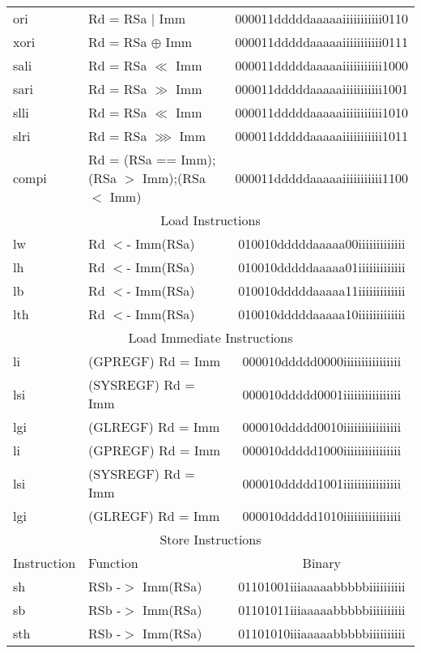 \documentclass[letterpaper, 11pt]{article}
\begin{document}
\begin{center}
\begin{longtable}{|l|l|c|}
			ori			& Rd = RSa $|$ Imm 								& 000011dddddaaaaaiiiiiiiiiii0110 \\
			xori		& Rd = RSa $\oplus$ Imm 						& 000011dddddaaaaaiiiiiiiiiii0111 \\
			sali		& Rd = RSa $\ll$ Imm 							& 000011dddddaaaaaiiiiiiiiiii1000 \\
			sari		& Rd = RSa $\gg$ Imm 							& 000011dddddaaaaaiiiiiiiiiii1001 \\
			slli		& Rd = RSa $\ll$ Imm 							& 000011dddddaaaaaiiiiiiiiiii1010 \\
			slri		& Rd = RSa $ \ggg  $ Imm 						& 000011dddddaaaaaiiiiiiiiiii1011 \\
			compi		& Rd = (RSa == Imm);(RSa $>$ Imm);(RSa $<$ Imm)	& 000011dddddaaaaaiiiiiiiiiii1100 \\
			\hline
			\multicolumn{3}{|c|}{Load Instructions} \\ \hline
			lw			& Rd $<$- Imm(RSa)								& 010010dddddaaaaa00iiiiiiiiiiiii \\
			lh			& Rd $<$- Imm(RSa)								& 010010dddddaaaaa01iiiiiiiiiiiii \\
			lb			& Rd $<$- Imm(RSa)								& 010010dddddaaaaa11iiiiiiiiiiiii \\
			lth			& Rd $<$- Imm(RSa)								& 010010dddddaaaaa10iiiiiiiiiiiii \\
			\hline
			\multicolumn{3}{|c|}{Load Immediate Instructions} \\ \hline
			li			& (GPREGF) Rd = Imm								& 000010ddddd0000iiiiiiiiiiiiiiii \\
			lsi			& (SYSREGF) Rd = Imm							& 000010ddddd0001iiiiiiiiiiiiiiii \\
			lgi			& (GLREGF) Rd = Imm								& 000010ddddd0010iiiiiiiiiiiiiiii \\
			li			& (GPREGF) Rd = Imm								& 000010ddddd1000iiiiiiiiiiiiiiii \\
			lsi			& (SYSREGF) Rd = Imm							& 000010ddddd1001iiiiiiiiiiiiiiii \\
			lgi			& (GLREGF) Rd = Imm								& 000010ddddd1010iiiiiiiiiiiiiiii \\
			\hline
			\multicolumn{3}{|c|}{Store Instructions} \\ \hline
			Instruction & Function 										& Binary \\ \hline
			sh			& RSb -$>$ Imm(RSa)								& 01101001iiiaaaaabbbbbiiiiiiiiii\\
			sb			& RSb -$>$ Imm(RSa)								& 01101011iiiaaaaabbbbbiiiiiiiiii\\
			sth			& RSb -$>$ Imm(RSa)								& 01101010iiiaaaaabbbbbiiiiiiiiii\\

\end{longtable}
\end{center}
\end{document}
